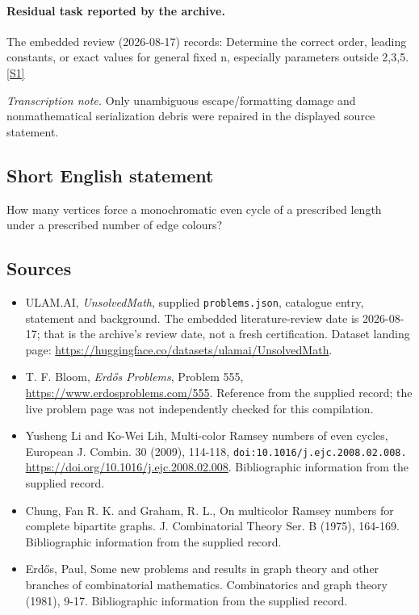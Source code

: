 \documentclass[11pt,a4paper]{article}
\newcommand{\sref}[2]{\hyperlink{source:#1:#2}{[S#2]}}
\begin{document}
\paragraph{Residual task reported by the archive.}

The embedded review (2026-08-17) records: Determine the correct order, leading constants, or exact values for general fixed n, especially parameters outside {2,3,5}. \sref{statement}{1}

{\small\emph{Transcription note.} Only unambiguous escape/formatting damage and nonmathematical serialization debris were repaired in the displayed source statement.}

\subsection{Short English statement}

How many vertices force a monochromatic even cycle of a prescribed length under a prescribed number of edge colours?

\subsection{Sources}

{\small

\begin{itemize}

\item[\hypertarget{source:statement:1}{S1}] ULAM.AI, \emph{UnsolvedMath}, supplied \texttt{problems.json}, catalogue entry, statement and background. The embedded literature-review date is 2026-08-17; that is the archive’s review date, not a fresh certification. Dataset landing page: \url{https://huggingface.co/datasets/ulamai/UnsolvedMath}.

\item[\hypertarget{source:statement:2}{S2}] T. F. Bloom, \emph{Erdős Problems}, Problem 555, \url{https://www.erdosproblems.com/555}. Reference from the supplied record; the live problem page was not independently checked for this compilation.

\item[\hypertarget{source:statement:3}{S3}] Yusheng Li and Ko-Wei Lih, Multi-color Ramsey numbers of even cycles, European J. Combin. 30 (2009), 114-118, \nolinkurl{doi:10.1016/j.ejc.2008.02.008.} \url{https://doi.org/10.1016/j.ejc.2008.02.008}. Bibliographic information from the supplied record.

\item[\hypertarget{source:statement:4}{S4}] Chung, Fan R. K. and Graham, R. L., On multicolor Ramsey numbers for complete bipartite graphs. J. Combinatorial Theory Ser. B (1975), 164-169. Bibliographic information from the supplied record.

\item[\hypertarget{source:statement:5}{S5}] Erd\H{o}s, Paul, Some new problems and results in graph theory and other branches of combinatorial mathematics. Combinatorics and graph theory (1981), 9-17. Bibliographic information from the supplied record.

\end{itemize}

}

\label{end:statement}
\end{document}
